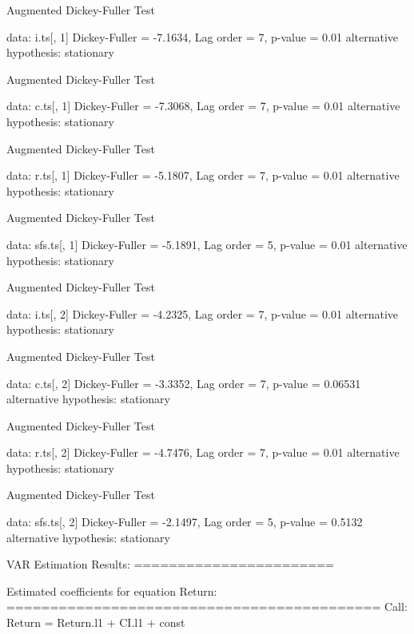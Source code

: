 \documentclass{article}
\begin{document}


\begin{Schunk}
\begin{Soutput}
	Augmented Dickey-Fuller Test

data:  i.ts[, 1]
Dickey-Fuller = -7.1634, Lag order = 7, p-value = 0.01
alternative hypothesis: stationary
\end{Soutput}
\begin{Soutput}
	Augmented Dickey-Fuller Test

data:  c.ts[, 1]
Dickey-Fuller = -7.3068, Lag order = 7, p-value = 0.01
alternative hypothesis: stationary
\end{Soutput}
\begin{Soutput}
	Augmented Dickey-Fuller Test

data:  r.ts[, 1]
Dickey-Fuller = -5.1807, Lag order = 7, p-value = 0.01
alternative hypothesis: stationary
\end{Soutput}
\begin{Soutput}
	Augmented Dickey-Fuller Test

data:  sfs.ts[, 1]
Dickey-Fuller = -5.1891, Lag order = 5, p-value = 0.01
alternative hypothesis: stationary
\end{Soutput}
\begin{Soutput}
	Augmented Dickey-Fuller Test

data:  i.ts[, 2]
Dickey-Fuller = -4.2325, Lag order = 7, p-value = 0.01
alternative hypothesis: stationary
\end{Soutput}
\begin{Soutput}
	Augmented Dickey-Fuller Test

data:  c.ts[, 2]
Dickey-Fuller = -3.3352, Lag order = 7, p-value = 0.06531
alternative hypothesis: stationary
\end{Soutput}
\begin{Soutput}
	Augmented Dickey-Fuller Test

data:  r.ts[, 2]
Dickey-Fuller = -4.7476, Lag order = 7, p-value = 0.01
alternative hypothesis: stationary
\end{Soutput}
\begin{Soutput}
	Augmented Dickey-Fuller Test

data:  sfs.ts[, 2]
Dickey-Fuller = -2.1497, Lag order = 5, p-value = 0.5132
alternative hypothesis: stationary
\end{Soutput}
\begin{Soutput}
VAR Estimation Results:
======================= 

Estimated coefficients for equation Return: 
=========================================== 
Call:
Return = Return.l1 + CI.l1 + const 


\end{Soutput}
\end{Schunk}
\end{document}
